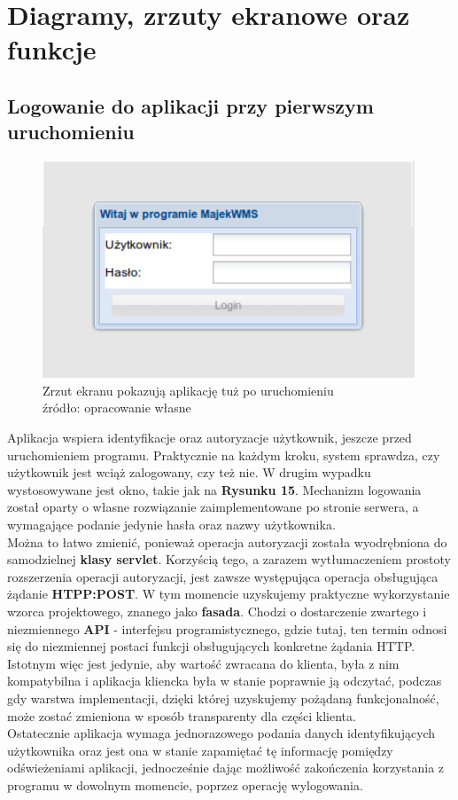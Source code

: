\section{Diagramy, zrzuty ekranowe oraz funkcje}
	\subsection{Logowanie do aplikacji przy pierwszym uruchomieniu}
		\begin{figure}[H]
			\centering
			\includegraphics[width=0.99\textwidth]{images/app/login}
			\caption[Aplikacja - Logowanie do programu]{
				Zrzut ekranu pokazują aplikację tuż po uruchomieniu \\
				źródło: opracowanie własne
			}
			\label{c7:fig:app:login}
		\end{figure}
		Aplikacja wspiera identyfikacje oraz autoryzacje użytkownik, jeszcze przed uruchomieniem programu. Praktycznie
		na każdym kroku, system sprawdza, czy użytkownik jest wciąż zalogowany, czy też nie. W drugim wypadku
		wystosowywane jest okno, takie jak na \textbf{Rysunku 15}. Mechanizm logowania został oparty
		o własne rozwiązanie zaimplementowane po stronie serwera, a wymagające podanie jedynie hasła oraz 
		nazwy użytkownika.\\ Można to łatwo zmienić, ponieważ operacja autoryzacji została wyodrębniona
		do samodzielnej \textbf{klasy servlet}. Korzyścią tego, a zarazem wytłumaczeniem prostoty rozszerzenia
		operacji autoryzacji, jest zawsze występująca operacja obsługująca żądanie \textbf{HTPP:POST}.
		W tym momencie uzyskujemy praktyczne wykorzystanie wzorca projektowego, znanego jako \textbf{fasada}.
		Chodzi o dostarczenie zwartego i niezmiennego \textbf{API} - interfejsu programistycznego, gdzie tutaj, ten termin odnosi się
		do niezmiennej postaci funkcji obsługujących konkretne żądania HTTP.
		Istotnym więc jest jedynie, aby wartość zwracana do klienta, była
		z nim kompatybilna i aplikacja kliencka była w stanie poprawnie ją odczytać, podczas gdy warstwa
		implementacji, dzięki której uzyskujemy pożądaną funkcjonalność,
		może zostać zmieniona w sposób transparenty dla części klienta. \\
		Ostatecznie aplikacja wymaga jednorazowego podania danych identyfikujących użytkownika oraz
		jest ona w stanie zapamiętać tę informację pomiędzy odświeżeniami aplikacji, jednocześnie
		dając możliwość zakończenia korzystania z programu w dowolnym momencie, poprzez operację
		wylogowania.
		
